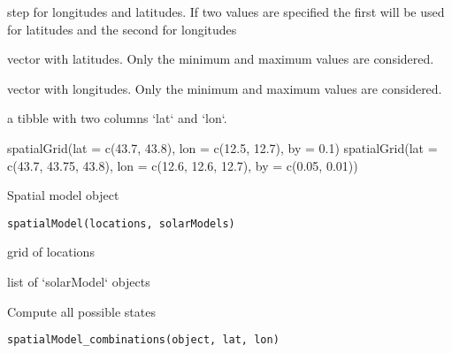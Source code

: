 \documentclass[a4paper]{book}
\begin{document}
%
\begin{Arguments}
\begin{ldescription}
\item[\code{by}] step for longitudes and latitudes. If two values are specified the first will be used for
latitudes and the second for longitudes

\item[\code{range\_lat}] vector with latitudes. Only the minimum and maximum values are considered.

\item[\code{range\_lon}] vector with longitudes. Only the minimum and maximum values are considered.
\end{ldescription}
\end{Arguments}
%
\begin{Value}
a tibble with two columns `lat` and `lon`.
\end{Value}
%
\begin{Examples}
\begin{ExampleCode}
spatialGrid(lat = c(43.7, 43.8), lon = c(12.5, 12.7), by = 0.1)
spatialGrid(lat = c(43.7, 43.75, 43.8), lon = c(12.6, 12.6, 12.7), by = c(0.05, 0.01))

\end{ExampleCode}
\end{Examples}
%
\begin{Description}\relax
Spatial model object
\end{Description}
%
\begin{Usage}
\begin{verbatim}
spatialModel(locations, solarModels)
\end{verbatim}
\end{Usage}
%
\begin{Arguments}
\begin{ldescription}
\item[\code{locations}] grid of locations

\item[\code{solarModels}] list of `solarModel` objects
\end{ldescription}
\end{Arguments}
%
\begin{Description}\relax
Compute all possible states
\end{Description}
%
\begin{Usage}
\begin{verbatim}
spatialModel_combinations(object, lat, lon)
\end{verbatim}
\end{Usage}
\end{document}
